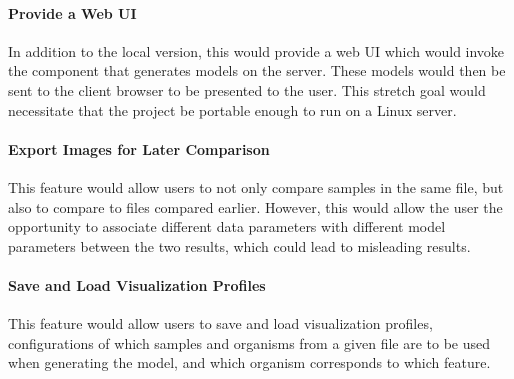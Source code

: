 \documentclass[letterpaper,10pt, onecolumn, draftclsnofoot]{IEEEtran}
\begin{document}
\paragraph{Provide a Web UI}
In addition to the local version, this would provide a web UI which would invoke the component that generates models on the server. These models would then be sent to the client browser to be presented to the user. This stretch goal would necessitate that the project be portable enough to run on a Linux server. 

\paragraph{Export Images for Later Comparison}
This feature would allow users to not only compare samples in the same file, but also to compare to files compared earlier. However, this would allow the user the opportunity to associate different data parameters with different model parameters between the two results, which could lead to misleading results.

\paragraph{Save and Load Visualization Profiles}
This feature would allow users to save and load visualization profiles, configurations of which samples and organisms from a given file are to be used when generating the model, and which organism corresponds to which feature.
\end{document}
